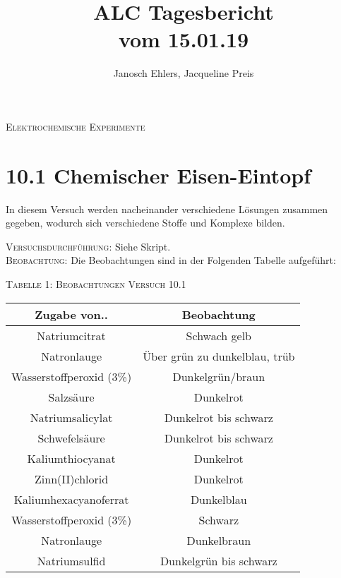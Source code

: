 \documentclass[11pt, a4paper]{article}
\begin{document}
\title{ALC Tagesbericht\\ vom 15.01.19}
\author{Janosch Ehlers, Jacqueline Preis}
\maketitle

	\begin{center}
	\textsc{Elektrochemische Experimente}
	\end{center}

\section{10.1 Chemischer Eisen-Eintopf}

In diesem Versuch werden nacheinander verschiedene Lösungen zusammen gegeben, wodurch sich verschiedene Stoffe und Komplexe bilden. 

\textsc{Versuchsdurchführung:} Siehe Skript.\\

\textsc{Beobachtung:}\hspace{5mm} Die Beobachtungen sind in der Folgenden Tabelle aufgeführt:\\

\begin{center}
\textsc{Tabelle 1: Beobachtungen Versuch 10.1}\\
\begin{tabular}{cc}
Zugabe von.. & Beobachtung\\
\hline
Natriumcitrat & Schwach gelb\\
Natronlauge & Über grün zu dunkelblau, trüb\\
Wasserstoffperoxid (3\%) & Dunkelgrün/braun\\
Salzsäure & Dunkelrot\\
Natriumsalicylat & Dunkelrot bis schwarz\\
Schwefelsäure & Dunkelrot bis schwarz\\
Kaliumthiocyanat & Dunkelrot\\
Zinn(II)chlorid & Dunkelrot\\
Kaliumhexacyanoferrat & Dunkelblau \\
Wasserstoffperoxid (3\%) & Schwarz\\
Natronlauge & Dunkelbraun\\
Natriumsulfid & Dunkelgrün bis schwarz\\
\end{tabular}
\end{center}
\end{document}
